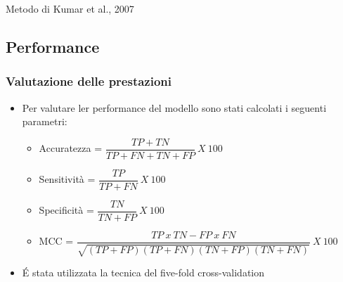 \documentclass{beamer}
\begin{document}
\begin{section}{Metodo di Kumar et al., 2007}
\subsection{Performance}
\begin{frame}
\frametitle{Valutazione delle prestazioni}
\begin{itemize}
\item Per valutare ler performance del modello sono stati calcolati i seguenti parametri:
\begin{itemize}
\item Accuratezza = $\dfrac{TP + TN}{TP + FN + TN + FP}\  X\ 100$
\item Sensitivit\`{a} =  $\dfrac{TP}{TP + FN}\  X\ 100$
\item Specificit\`{a} = $\dfrac{TN}{TN + FP}\  X\ 100$
\item MCC = $\dfrac{TP \ x \ TN - FP \ x \ FN }{\sqrt{(TP+FP)(TP+FN)(TN+FP)(TN+FN)}}\  X\ 100$
\end{itemize}
\item \'{E} stata utilizzata la tecnica del five-fold cross-validation
\end{itemize}
\end{frame}
\end{section}
\end{document}
